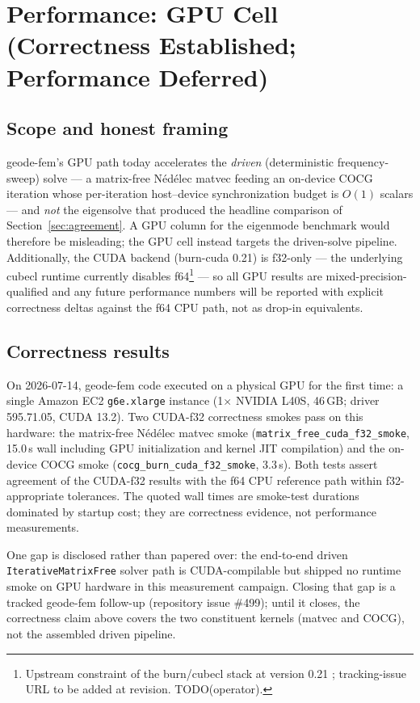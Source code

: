 \documentclass{anvil-paper}
\begin{document}
\section{Performance: GPU Cell (Correctness Established; Performance
Deferred)}
\label{sec:perf-gpu}

\subsection{Scope and honest framing}

geode-fem's GPU path today accelerates the \emph{driven} (deterministic
frequency-sweep) solve --- a matrix-free N\'ed\'elec matvec feeding an
on-device COCG iteration whose per-iteration host--device synchronization
budget is $O(1)$ scalars --- and \emph{not} the eigensolve that produced
the headline comparison of Section~\ref{sec:agreement}. A GPU column for
the eigenmode benchmark would therefore be misleading; the GPU cell
instead targets the driven-solve pipeline. Additionally, the CUDA backend
(burn-cuda 0.21) is f32-only --- the underlying cubecl runtime currently
disables f64\footnote{Upstream constraint of the burn/cubecl stack at
version 0.21 \citep{burn}; tracking-issue URL to be added at revision.
TODO(operator).} --- so all GPU results are mixed-precision-qualified and
any future performance numbers will be reported with explicit correctness
deltas against the f64 CPU path, not as drop-in equivalents.

\subsection{Correctness results}

On 2026-07-14, geode-fem code executed on a physical GPU for the first
time: a single Amazon EC2 \texttt{g6e.xlarge} instance (1$\times$ NVIDIA
L40S, 46\,GB; driver 595.71.05, CUDA 13.2). Two CUDA-f32 correctness
smokes pass on this hardware: the matrix-free N\'ed\'elec matvec smoke
(\texttt{matrix\_free\_cuda\_f32\_smoke}, 15.0\,s wall including GPU
initialization and kernel JIT compilation) and the on-device COCG smoke
(\texttt{cocg\_burn\_cuda\_f32\_smoke}, 3.3\,s). Both tests assert
agreement of the CUDA-f32 results with the f64 CPU reference path within
f32-appropriate tolerances. The quoted wall times are smoke-test durations
dominated by startup cost; they are correctness evidence, not performance
measurements.

One gap is disclosed rather than papered over: the end-to-end driven
\texttt{IterativeMatrixFree} solver path is CUDA-compilable but shipped no
runtime smoke on GPU hardware in this measurement campaign. Closing that
gap is a tracked geode-fem follow-up (repository issue \#499); until it
closes, the correctness claim above covers the two constituent kernels
(matvec and COCG), not the assembled driven pipeline.
\end{document}
